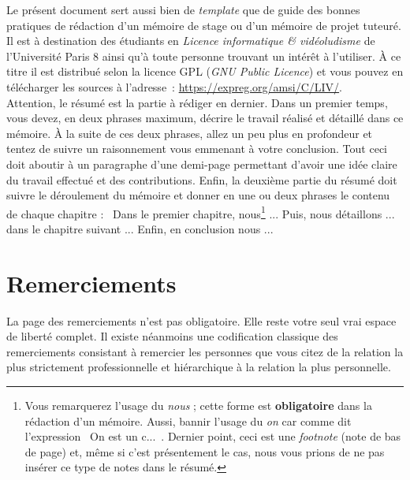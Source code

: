 \documentclass[a4paper, 12pt]{book}
\newcommand{\listofprograms}{\listof{programslist}{Liste des codes source}}
\newcounter{program}[subsection]
\begin{document}
Le présent document sert aussi bien de \emph{template} que de guide
des bonnes pratiques de rédaction d'un mémoire de stage ou d'un
mémoire de projet tuteuré. Il est à destination des étudiants en
\emph{Licence informatique \& vidéoludisme} de l'Université
Paris 8 ainsi qu'à toute personne trouvant un intérêt à
l'utiliser. \`A ce titre il est distribué selon la licence GPL
(\emph{GNU Public Licence}) et vous pouvez en télécharger les sources
à l'adresse~: \url{https://expreg.org/amsi/C/LIV/}.\\


Attention, le résumé est la partie à rédiger en dernier. Dans un
premier temps, vous devez, en deux phrases maximum, décrire le travail
réalisé et détaillé dans ce mémoire. \`A la suite de ces deux phrases,
allez un peu plus en profondeur et tentez de suivre un raisonnement
vous emmenant à votre conclusion. Tout ceci doit aboutir à un
paragraphe d'une demi-page permettant d'avoir une idée claire du
travail effectué et des contributions. Enfin, la deuxième partie du
résumé doit suivre le déroulement du mémoire et donner en une ou deux
phrases le contenu de chaque chapitre : \guillemotleft{}~Dans le
premier chapitre, nous\footnote{Vous remarquerez l'usage du
  \emph{nous} ; cette forme est \textbf{obligatoire} dans la rédaction
  d'un mémoire. Aussi, bannir l'usage du \emph{on} car comme dit
  l'expression \guillemotleft{}~On est un c...~\guillemotright. Dernier
  point, ceci est une \emph{footnote} (note de bas de page) et, même
  si c'est présentement le cas, nous vous prions de ne pas insérer ce
  type de notes dans le résumé.} ... Puis, nous détaillons ... dans le
chapitre suivant ... Enfin, en conclusion nous ...~\guillemotright
\chapter*{Remerciements}
 La page des
remerciements n'est pas obligatoire. Elle reste votre seul vrai espace
de liberté complet. Il existe néanmoins une codification classique des
remerciements consistant à remercier les personnes que vous citez de
la relation la plus strictement professionnelle et hiérarchique à la
relation la plus personnelle.
\tableofcontents
\listoffigures
\listofprograms
\mainmatter
\end{document}

